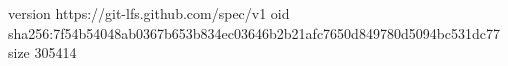 version https://git-lfs.github.com/spec/v1
oid sha256:7f54b54048ab0367b653b834ec03646b2b21afc7650d849780d5094bc531dc77
size 305414
